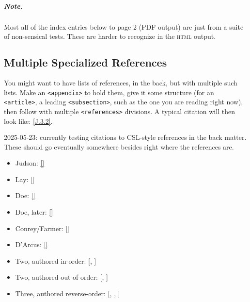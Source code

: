 \documentclass{amsart}
\theoremstyle{plain}%
\theoremstyle{definition}%
\theoremstyle{remark}%
\newcommand{\xreffont}{\relax}
\newcommand{\mono}[1]{\texttt{#1}}
\newcommand{\initialism}[1]{\textsc{\MakeLowercase{#1}}}
\numberwithin{equation}{section}
\begin{document}
\subparagraph*{Note.}\label{appendix-index-6}%
Most all of the index entries below to page 2 (PDF output) are just from a suite of non-sensical tests.  These are harder to recognize in the \initialism{HTML} output.%
%
%
\typeout{************************************************}
\typeout{************************************************}
%
\label{appendix-multiple-references}%
%
%
\typeout{************************************************}
\typeout{************************************************}
%
\subsection{Multiple Specialized References}\label{appendix-multiple-references-2}%
You might want to have lists of references, in the back, but with multiple such lists.  Make an \mono{<appendix>} to hold them, give it some structure (for an \mono{<article>}, a leading \mono{<subsection>}, such as the one you are reading right now), then follow with multiple \mono{<references>} divisions.  A typical citation will then look like: \hyperlink{biblio-strang-article-tres}{[{\xreffont J.3.2}]}.%
\par
2025-05-23: currently testing citations to CSL-style references in the back matter.  These should go eventually somewhere besides right where the references are.%
\begin{itemize}[label=\textbullet]
\item{}Judson: \hyperlink{biblio-judson-aata}{[{\xreffont 1}]}%
\item{}Lay: \hyperlink{biblio-lay-article}{[{\xreffont 2}]}%
\item{}Doe: \hyperlink{citeproc-py-item-3}{[{\xreffont 4}]}%
\item{}Doe, later: \hyperlink{citeproc-py-item-3-later}{[{\xreffont 3}]}%
\item{}Conrey\slash{}Farmer: \hyperlink{conrey-farmer}{[{\xreffont 5}]}%
\item{}D'Arcus: \hyperlink{citeproc-py-item-5}{[{\xreffont 6}]}%
\item{}Two, authored in-order: [\hyperlink{conrey-farmer}{{\xreffont 5}}, \hyperlink{citeproc-py-item-5}{{\xreffont 6}}]%
\item{}Two, authored out-of-order: [\hyperlink{citeproc-py-item-5}{{\xreffont 6}}, \hyperlink{conrey-farmer}{{\xreffont 5}}]%
\item{}Three, authored reverse-order: [\hyperlink{biblio-lay-article}{{\xreffont 2}}, \hyperlink{biblio-judson-aata}{{\xreffont 1}}, \hyperlink{citeproc-py-item-3}{{\xreffont 4}}]%
\end{itemize}
\end{document}

